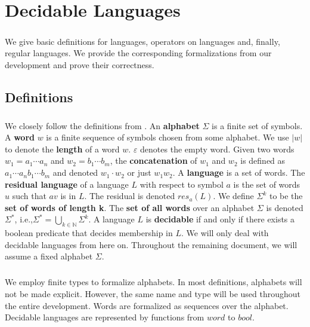 \chapter{Decidable Languages}

\paragraph{}
We give basic definitions for languages, operators on languages and, finally, regular languages.
We provide the corresponding formalizations from our development and prove their correctness.

\section{Definitions}
\paragraph{}
We closely follow the definitions from \cite{DBLP:books/daglib/0011126}.
An \textbf{alphabet} $\Sigma$ is a finite set of symbols. 
A \textbf{word} $w$ is a finite sequence of symbols chosen from some alphabet. 
We use $|w|$ to denote the \textbf{length} of a word $w$. $\varepsilon$ denotes the empty word.
Given two words $w_1 = a_1 \cdots a_n$ and $w_2 = b_1 \cdots b_m$, the \textbf{concatenation} of $w_1$ and $w_2$ is defined as $a_1 \cdots a_n b_1 \cdots b_m$ and denoted $w_1 \cdot w_2$ or just $w_1 w_2$.
A \textbf{language} is a set of words.
The \textbf{residual language} of a language $L$ with respect to symbol $a$ is the set of words $u$ such that $a v$ is in $L$. The residual is denoted $res_a(L)$.
We define $\Sigma^k$ to be the \textbf{set of words of length k}.
The \textbf{set of all words} over an alphabet $\Sigma$ is denoted $\Sigma^*$, i.e.,$\Sigma^* = \bigcup_{k \in \mathbb{N}} \Sigma^k$.
A language $L$ is \textbf{decidable} if and only if there exists a boolean predicate that decides membership in $L$.
We will only deal with decidable languages from here on.
Throughout the remaining document, we will assume a fixed alphabet $\Sigma$.

    \paragraph{} 
    We employ finite types to formalize alphabets. 
    In most definitions, alphabets will not be made explicit.
    However, the same name and type will be used throughout the entire development.
    Words are formalized as sequences over the alphabet.
    Decidable languages are represented by functions from $word$ to $bool$.

